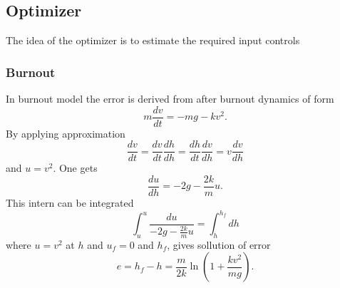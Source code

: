 \subsection{Optimizer}
The idea of the optimizer is to estimate the required input controls 
\subsubsection{Burnout}
In burnout model the error is derived from after burnout dynamics of form 
\begin{equation}
    m \frac{dv}{dt} = -mg - kv^2.
\end{equation}
By applying approximation
\begin{equation}
    \frac{dv}{dt} = \frac{dv}{dt}\frac{dh}{dh} = \frac{dh}{dt}\frac{dv}{dh} = v \frac{dv}{dh}
\end{equation}
and $u = v^2$. One gets
\begin{equation}
    \frac{du}{dh} = -2g -\frac{2k}{m}u.
\end{equation}
This intern can be integrated
\begin{equation}
    \int_{u}^{u} \frac{du}{-2g -\frac{2k}{m}u} = \int_{h}^{h_f}dh
\end{equation}
where $u = v^2$ at $h$ and $u_f = 0$ and $h_f$, gives sollution of error
\begin{equation}
    e = h_f - h = \frac{m}{2k}\ln\left(1 + \frac{k v^2}{mg}\right).
\end{equation}